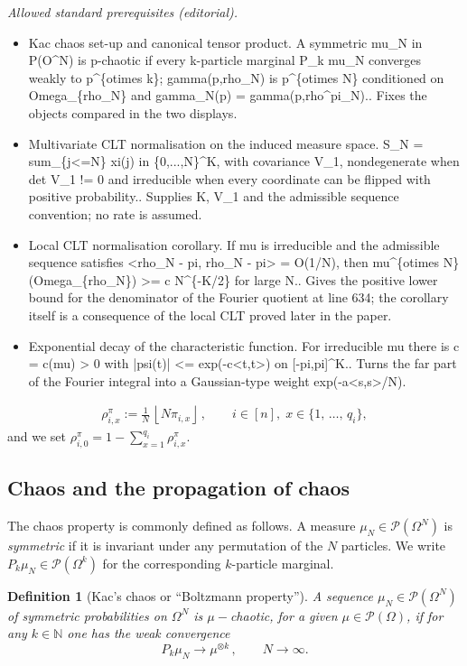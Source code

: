 \documentclass[10pt,a4paper]{article}
\newtheorem{defi}[theorem]{Definition}
\newcommand{\Om}{\Omega}
\newcommand{\rhoN}{\rho^{\pi}}
\newcommand{\cP}{\mathcal{P}}
\newcommand{\bbN}{\mathbb{N}}
\let\O=\Omega
\begin{document}
\noindent\textit{Allowed standard prerequisites (editorial).}\begin{itemize}
\item Kac chaos set-up and canonical tensor product. A symmetric mu\_N in P(O\textasciicircum{}N) is p-chaotic if every k-particle marginal P\_k mu\_N converges weakly to p\textasciicircum{}\{otimes k\}; gamma(p,rho\_N) is p\textasciicircum{}\{otimes N\} conditioned on Omega\_\{rho\_N\} and gamma\_N(p) = gamma(p,rho\textasciicircum{}pi\_N).. Fixes the objects compared in the two displays.
\item Multivariate CLT normalisation on the induced measure space. S\_N = sum\_\{j<=N\} xi(j) in \{0,...,N\}\textasciicircum{}K, with covariance V\_1, nondegenerate when det V\_1 != 0 and irreducible when every coordinate can be flipped with positive probability.. Supplies K, V\_1 and the admissible sequence convention; no rate is assumed.
\item Local CLT normalisation corollary. If mu is irreducible and the admissible sequence satisfies <rho\_N - pi, rho\_N - pi> = O(1/N), then mu\textasciicircum{}\{otimes N\}(Omega\_\{rho\_N\}) >= c N\textasciicircum{}\{-K/2\} for large N.. Gives the positive lower bound for the denominator of the Fourier quotient at line 634; the corollary itself is a consequence of the local CLT proved later in the paper.
\item Exponential decay of the characteristic function. For irreducible mu there is c = c(mu) > 0 with |psi(t)| <= exp(-c<t,t>) on [-pi,pi]\textasciicircum{}K.. Turns the far part of the Fourier integral into a Gaussian-type weight exp(-a<s,s>/N).
\end{itemize}\medskip
\begin{align}\label{rhoseq}
\rhoN_{i,x} :=\tfrac1N\,{\left\lfloor N \pi_{i,x}\right\rfloor}\,, \qquad i\in[n], \;x\in \{1,\,\dots,\,q_i\},
\end{align}
and we set $ \rhoN_{i,0}=1-\sum_{x=1}^{q_i}\rhoN_{i,x}$.

\subsection{Chaos and the propagation of chaos}

The chaos property is commonly defined as follows. A measure $\mu_N \in \cP(\O^{N})$ is \emph{symmetric} if it is invariant under any permutation of the $N$ particles. We write $ P_k\mu_N\in\cP(\O^k)$ for the corresponding $k$-particle marginal.


\begin{defi}[Kac's chaos or ``Boltzmann property'']\label{kacschaos}
A sequence $\mu_N \in \cP(\O^{N})$ of symmetric probabilities on $\Om^{N}$ is $\mu-$chaotic, for a given $\mu \in \cP(\O)$, if for any $k \in \bbN$ one has the weak convergence
\[
P_k\mu_N\longrightarrow \mu^{\otimes k}\,,\qquad N\to\infty.
\]
\end{defi}
\end{document}

